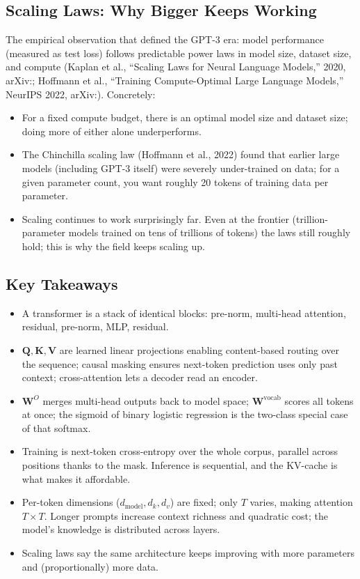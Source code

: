 \documentclass[11pt]{article}
\theoremstyle{remark}
\newcommand{\arxiv}[1]{arXiv:\allowbreak #1}
\begin{document}
\subsection{Scaling Laws: Why Bigger Keeps Working}

The empirical observation that defined the GPT-3 era: model performance (measured as test loss) follows predictable power laws in model size, dataset size, and compute (Kaplan et al., ``Scaling Laws for Neural Language Models,'' 2020, \arxiv{2001.08361}; Hoffmann et al., ``Training Compute-Optimal Large Language Models,'' NeurIPS 2022, \arxiv{2203.15556}). Concretely:
\begin{itemize}[noitemsep]
    \item For a fixed compute budget, there is an optimal model size and dataset size; doing more of either alone underperforms.
    \item The Chinchilla scaling law (Hoffmann et al., 2022) found that earlier large models (including GPT-3 itself) were severely under-trained on data; for a given parameter count, you want roughly 20 tokens of training data per parameter.
    \item Scaling continues to work surprisingly far. Even at the frontier (trillion-parameter models trained on tens of trillions of tokens) the laws still roughly hold; this is why the field keeps scaling up.
\end{itemize}

\subsection{Key Takeaways}
\begin{itemize}[noitemsep]
  \item A transformer is a stack of identical blocks: pre-norm, multi-head attention, residual, pre-norm, MLP, residual.
  \item \(\mathbf{Q},\mathbf{K},\mathbf{V}\) are learned linear projections enabling content-based routing over the sequence; causal masking ensures next-token prediction uses only past context; cross-attention lets a decoder read an encoder.
  \item \(\mathbf{W}^O\) merges multi-head outputs back to model space; \(\mathbf{W}^{\text{vocab}}\) scores all tokens at once; the sigmoid of binary logistic regression is the two-class special case of that softmax.
  \item Training is next-token cross-entropy over the whole corpus, parallel across positions thanks to the mask. Inference is sequential, and the KV-cache is what makes it affordable.
  \item Per-token dimensions (\(d_{\text{model}},d_k,d_v\)) are fixed; only \(T\) varies, making attention \(T\times T\). Longer prompts increase context richness and quadratic cost; the model's knowledge is distributed across layers.
  \item Scaling laws say the same architecture keeps improving with more parameters and (proportionally) more data.
\end{itemize}
\end{document}
